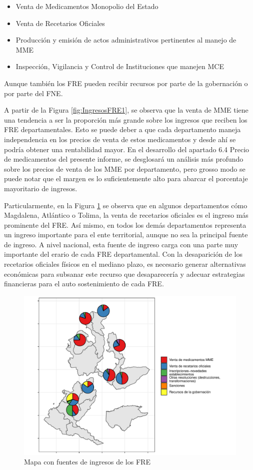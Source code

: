 \documentclass[
]{book}
\begin{document}
\begin{itemize}
\item
  Venta de Medicamentos Monopolio del Estado
\item
  Venta de Recetarios Oficiales
\item
  Producción y emisión de actos administrativos pertinentes al manejo de MME
\item
  Inspección, Vigilancia y Control de Instituciones que manejen MCE
\end{itemize}

Aunque también los FRE pueden recibir recursos por parte de la gobernación o por parte del FNE.

A partir de la Figura \ref{fig:IngresosFRE1}, se observa que la venta de MME tiene una tendencia a ser la proporción más grande sobre los ingresos que reciben los FRE departamentales. Esto se puede deber a que cada departamento maneja independencia en los precios de venta de estos medicamentos y desde ahí se podría obtener una rentabilidad mayor. En el desarrollo del apartado 6.4 Precio de medicamentos del presente informe, se desglosará un análisis más profundo sobre los precios de venta de los MME por departamento, pero grosso modo se puede notar que el margen es lo suficientemente alto para abarcar el porcentaje mayoritario de ingresos.

Particularmente, en la Figura \ref{fig:IngresosFRE2} se observa que en algunos departamentos cómo Magdalena, Atlántico o Tolima, la venta de recetarios oficiales es el ingreso más prominente del FRE. Así mismo, en todos los demás departamentos representa un ingreso importante para el ente territorial, aunque no sea la principal fuente de ingreso. A nivel nacional, esta fuente de ingreso carga con una parte muy importante del erario de cada FRE departamental. Con la desaparición de los recetarios oficiales físicos en el mediano plazo, es necesario generar alternativas económicas para subsanar este recurso que desaparecería y adecuar estrategias financieras para el auto sostenimiento de cada FRE.

\begin{figure}

{\centering \includegraphics[width=0.85\linewidth]{InformeFinal_files/figure-latex/IngresosFRE2-1} 

}

\caption{Mapa con fuentes de ingresos de los FRE}\label{fig:IngresosFRE2}
\end{figure}
\end{document}
